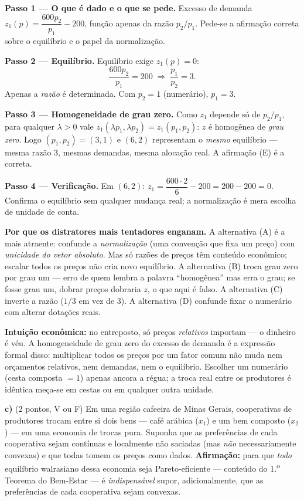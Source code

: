 \begin{solucao}
\textbf{Passo 1 --- O que é dado e o que se pede.} Excesso de demanda $z_1(p)=\dfrac{600 p_2}{p_1}-200$, função apenas da razão $p_2/p_1$. Pede-se a afirmação correta sobre o equilíbrio e o papel da normalização.

\textbf{Passo 2 --- Equilíbrio.} Equilíbrio exige $z_1(p)=0$:
\[ \frac{600 p_2}{p_1} = 200 \;\Longrightarrow\; \frac{p_1}{p_2} = 3. \]
Apenas a \emph{razão} é determinada. Com $p_2=1$ (numerário), $p_1=3$.

\textbf{Passo 3 --- Homogeneidade de grau zero.} Como $z_1$ depende só de $p_2/p_1$, para qualquer $\lambda>0$ vale $z_1(\lambda p_1,\lambda p_2)=z_1(p_1,p_2)$: $z$ é homogênea de \emph{grau zero}. Logo $(p_1,p_2)=(3,1)$ e $(6,2)$ representam o \emph{mesmo} equilíbrio --- mesma razão $3$, mesmas demandas, mesma alocação real. A afirmação (E) é a correta.

\textbf{Passo 4 --- Verificação.} Em $(6,2)$: $z_1 = \dfrac{600\cdot 2}{6} - 200 = 200 - 200 = 0$. Confirma o equilíbrio sem qualquer mudança real; a normalização é mera escolha de unidade de conta.

\textbf{Por que os distratores mais tentadores enganam.} A alternativa (A) é a mais atraente: confunde a \emph{normalização} (uma convenção que fixa um preço) com \emph{unicidade do vetor absoluto}. Mas só razões de preços têm conteúdo econômico; escalar todos os preços não cria novo equilíbrio. A alternativa (B) troca grau zero por grau um --- erro de quem lembra a palavra ``homogênea'' mas erra o grau; se fosse grau um, dobrar preços dobraria $z$, o que aqui é falso. A alternativa (C) inverte a razão ($1/3$ em vez de $3$). A alternativa (D) confunde fixar o numerário com alterar dotações reais.

\textbf{Intuição econômica:} no entreposto, só preços \emph{relativos} importam --- o dinheiro é véu. A homogeneidade de grau zero do excesso de demanda é a expressão formal disso: multiplicar todos os preços por um fator comum não muda nem orçamentos relativos, nem demandas, nem o equilíbrio. Escolher um numerário (cesta composta $=1$) apenas ancora a régua; a troca real entre os produtores é idêntica meça-se em cestas ou em qualquer outra unidade.
\end{solucao}

\textbf{c)} (2 pontos, V ou F) Em uma região cafeeira de Minas Gerais, cooperativas de produtores trocam entre si dois bens --- café arábica ($x_1$) e um bem composto ($x_2$) --- em uma economia de trocas pura. Suponha que as preferências de cada cooperativa sejam contínuas e localmente não saciadas (mas \emph{não} necessariamente convexas) e que todas tomem os preços como dados. \textbf{Afirmação:} para que \emph{todo} equilíbrio walrasiano dessa economia seja Pareto-eficiente --- conteúdo do 1.\textsuperscript{o} Teorema do Bem-Estar --- é \emph{indispensável} supor, adicionalmente, que as preferências de cada cooperativa sejam convexas.

